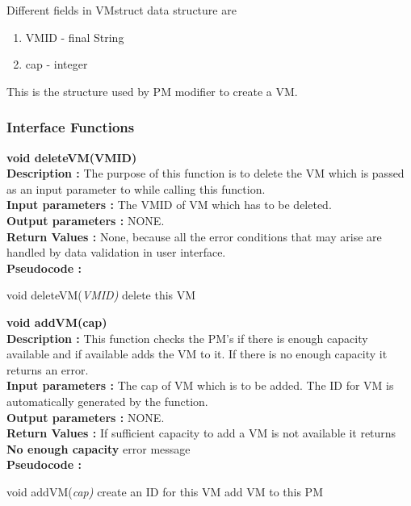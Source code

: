 \documentclass[a4paper,11pt]{article}
\begin{document}
Different fields in VMstruct data structure are
\begin{enumerate}
 \item VM\textunderscore ID - final String
 \item cap - integer
\end{enumerate}
This is the structure used by PM modifier to create a VM.
\subsubsection{Interface Functions}
\textbf{ void deleteVM(VM\textunderscore ID)}
\\
\textbf{Description :} The purpose of this function is to delete the VM which is passed as an input parameter to while calling this function.
\\
\textbf{Input parameters :} The VM\textunderscore ID of VM which has to be deleted.
\\
\textbf{Output parameters :} NONE.
\\
\textbf{Return Values :} None, because all the error conditions that may arise are handled by data validation in user interface.
\\
\textbf{Pseudocode :}
\begin{algorithmic}[1]
\STATE void deleteVM(\emph{VM\textunderscore ID)}
\STATE delete this VM
\ENDIF
\ENDFOR
\ENDFOR
\end{algorithmic}
\textbf{ void addVM(cap)}
\\
\textbf{Description :} This function checks the PM's if there is enough capacity available and if available adds the VM to it. If there is no enough capacity 
it returns an error.
\\
\textbf{Input parameters :} The cap of VM which is to be added. The ID for VM is automatically generated by the function.
\\
\textbf{Output parameters :} NONE.
\\
\textbf{Return Values :} If sufficient capacity to add a VM is not available it returns \textbf{No enough capacity} error message
\\
\textbf{Pseudocode :}
\begin{algorithmic}[1]
\STATE void addVM(\emph{cap)}
\STATE create an ID for this VM
\STATE add VM to this PM
\ENDIF
\ENDFOR
\end{algorithmic}
\end{document}
